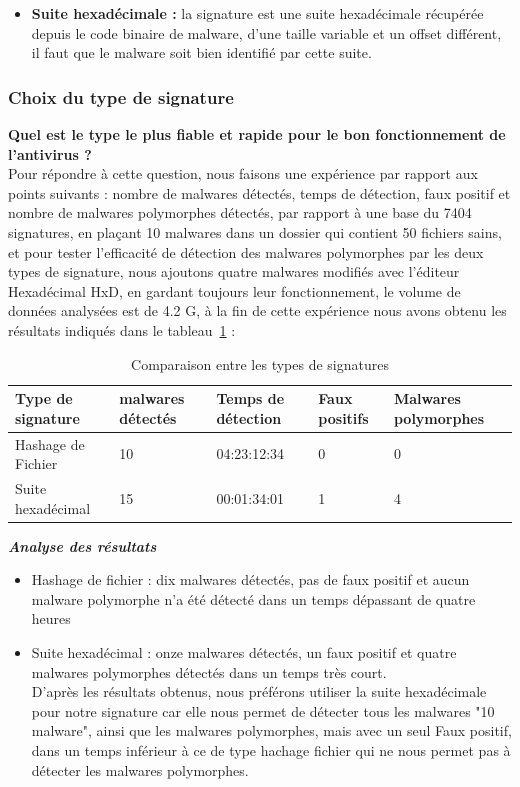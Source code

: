\begin{itemize}
\begin{list}{•}{}
\end{list}
\item \textbf{Suite hexadécimale : }la signature est une suite hexadécimale récupérée depuis le code binaire de malware, d'une taille variable et un offset différent, il faut que le malware soit bien identifié par cette suite.  
\end{itemize}
\subsubsection{Choix du type de signature}
\textbf{Quel est le type le plus fiable et rapide pour le bon fonctionnement de l'antivirus ?}\\
Pour répondre à cette question, nous faisons une expérience par rapport aux points suivants : nombre de malwares détectés, temps de détection, faux positif et nombre de malwares polymorphes détectés, par rapport à une base du 7404 signatures, en plaçant 10 malwares dans un dossier qui contient 50 fichiers sains, et pour tester l'efficacité de détection des malwares polymorphes par les deux types de signature, nous ajoutons quatre malwares modifiés avec l'éditeur Hexadécimal HxD, en gardant toujours leur   fonctionnement, le volume de données analysées est de 4.2 G, à la fin de cette expérience nous avons obtenu les résultats indiqués dans le tableau~\ref{signatures} : 
\begin{table}[H]
\begin{center}
\begin{tabular}{|p{3cm}|p{2cm}|p{3cm}|p{2cm}|p{2cm}|}
\hline Type de signature &  malwares détectés & Temps de détection & Faux positifs & Malwares polymorphes\\
\hline Hashage de Fichier & 10 & 04:23:12:34 & 0 & 0 \\
\hline Suite hexadécimal & 15 & 00:01:34:01 & 1 & 4 \\
\hline
\end{tabular}
\caption{Comparaison entre les types de signatures}
\label{signatures}
\end{center}
\end{table}
\textbf{\textit{Analyse des résultats }}
\begin{itemize}
\item Hashage de fichier : dix malwares détectés, pas de faux positif et aucun malware polymorphe n'a été détecté dans un temps dépassant de quatre heures 
\item Suite hexadécimal : onze malwares détectés, un faux positif et quatre malwares polymorphes détectés dans un temps très court. \\


D'après les résultats obtenus, nous préférons utiliser la suite hexadécimale pour notre signature car elle nous permet de détecter tous les malwares "10 malware", ainsi que les malwares polymorphes, mais avec un seul Faux positif, dans un temps inférieur à ce de type hachage fichier qui ne nous permet pas à détecter les malwares polymorphes. 

\end{itemize}
\newpage
